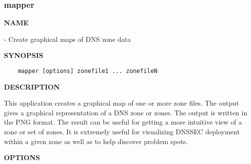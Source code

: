 \clearpage

\subsubsection{mapper}

{\bf NAME}

 - Create graphical maps of DNS zone data

{\bf SYNOPSIS}

\begin{verbatim}
    mapper [options] zonefile1 ... zonefileN
\end{verbatim}

{\bf DESCRIPTION}

This application creates a graphical map of one or more zone files.  The
output gives a graphical representation of a DNS zone or zones.  The output
is written in the PNG format.  The result can be useful for getting a more
intuitive view of a zone or set of zones.  It is extremely useful for
visualizing DNSSEC deployment within a given zone as well as to help discover
problem spots.

{\bf OPTIONS}


